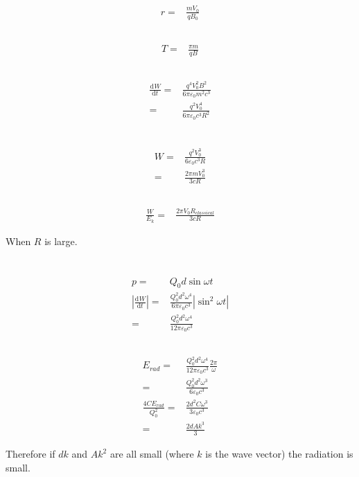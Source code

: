 \documentclass[10pt,fleqn]{article}
\newcommand{\ud}{\mathrm{d}}
\newcommand{\eqar}[1]
{
  \begin{align*}
    #1
  \end{align*}
}
\newcommand{\abs}[1]{{\left|{#1}\right|}}
\newcommand{\diff}[3][{}]{{\frac{\ud^{#1} {#2}}{\ud {#3}{}^{#1}}}}
\begin{document}
\section{}
\subsection{}
\eqar{
  r=&\frac{mV_0}{qB_0}
}
\subsection{}
\eqar{
  T=&\frac{\pi m}{qB}
}
\subsection{}
\eqar{
  \diff{W}{t}=&\frac{q^4V_0^2B^2}{6\pi\varepsilon_0m^2c^3}\\
  =&\frac{q^2V_0^4}{6\pi\varepsilon_0c^3R^2}\\
}
\subsection{}
\eqar{
  W=&\frac{q^2V_0^3}{6\varepsilon_0c^3R}\\
  =&\frac{2\pi mV_0^3}{3cR}
}
\subsection{}
\eqar{
  \frac{W}{E_k}=&\frac{2\pi V_0R_{classical}}{3cR}
}
When $R$ is large.
\subsection{}
\section{}
\subsection{}
\eqar{
  p=&Q_0d\sin\omega t\\
  \abs{\diff{W}{t}}=&\frac{Q_0^2d^2\omega^4}{6\pi\varepsilon_0c^3}\abs{\sin^2\omega t}\\
  =&\frac{Q_0^2d^2\omega^4}{12\pi\varepsilon_0c^3}
}
\subsection{}
\eqar{
  E_{rad}=&\frac{Q_0^2d^2\omega^4}{12\pi\varepsilon_0c^3}\frac{2\pi}{\omega}\\
  =&\frac{Q_0^2d^2\omega^3}{6\varepsilon_0c^3}\\
  \frac{4CE_{rad}}{Q_0^2}=&\frac{2d^2C\omega^3}{3\varepsilon_0c^3}\\
  =&\frac{2dAk^3}{3}
}
Therefore if $dk$ and $Ak^2$ are all small (where $k$ is the wave vector) the radiation is small.
\end{document}
